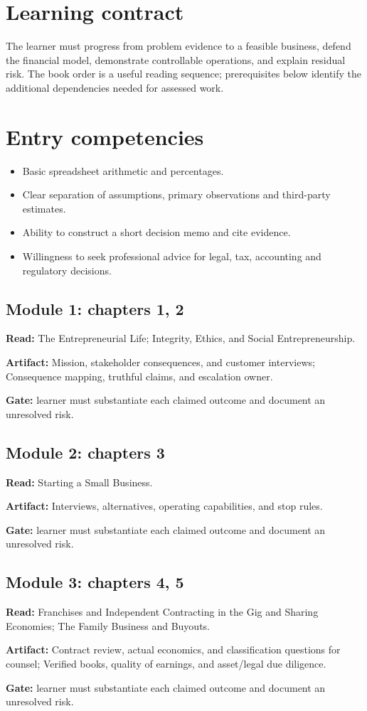 \documentclass[11pt]{article}
\begin{document}
\SuiteOpen
\section{Learning contract}
The learner must progress from problem evidence to a feasible business, defend the financial model, demonstrate controllable operations, and explain residual risk. The book order is a useful reading sequence; prerequisites below identify the additional dependencies needed for assessed work.
\section{Entry competencies}
\begin{itemize}[leftmargin=*,itemsep=3pt]
\item Basic spreadsheet arithmetic and percentages.
\item Clear separation of assumptions, primary observations and third-party estimates.
\item Ability to construct a short decision memo and cite evidence.
\item Willingness to seek professional advice for legal, tax, accounting and regulatory decisions.
\end{itemize}

\subsection*{Module 1: chapters 1, 2}
\textbf{Read:} The Entrepreneurial Life; Integrity, Ethics, and Social Entrepreneurship.\par
\textbf{Artifact:} Mission, stakeholder consequences, and customer interviews; Consequence mapping, truthful claims, and escalation owner.\par
\textbf{Gate:} learner must substantiate each claimed outcome and document an unresolved risk.\par
\subsection*{Module 2: chapters 3}
\textbf{Read:} Starting a Small Business.\par
\textbf{Artifact:} Interviews, alternatives, operating capabilities, and stop rules.\par
\textbf{Gate:} learner must substantiate each claimed outcome and document an unresolved risk.\par
\subsection*{Module 3: chapters 4, 5}
\textbf{Read:} Franchises and Independent Contracting in the Gig and Sharing Economies; The Family Business and Buyouts.\par
\textbf{Artifact:} Contract review, actual economics, and classification questions for counsel; Verified books, quality of earnings, and asset/legal due diligence.\par
\textbf{Gate:} learner must substantiate each claimed outcome and document an unresolved risk.\par
\end{document}
